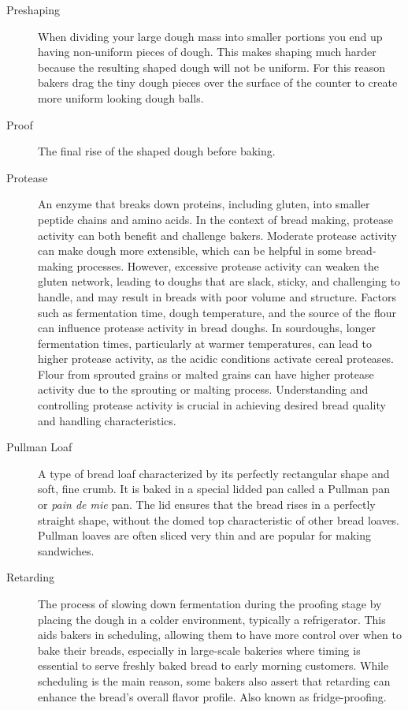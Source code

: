 \begin{description}
\item[Preshaping] When dividing your large dough mass into smaller portions you end
up having non-uniform pieces of dough. This makes shaping much harder because the
resulting shaped dough will not be uniform. For this reason bakers drag the tiny dough
pieces over the surface of the counter to create more uniform looking dough balls.

\item[Proof] The final rise of the shaped dough before baking.

\item[Protease] An enzyme that breaks down proteins, including gluten, into smaller
peptide chains and amino acids. In the context of bread making, protease activity can
both benefit and challenge bakers. Moderate protease activity can make dough more
extensible, which can be helpful in some bread-making processes. However, excessive
protease activity can weaken the gluten network, leading to doughs that are slack,
sticky, and challenging to handle, and may result in breads with poor volume and
structure. Factors such as fermentation time, dough temperature, and the source of the
flour can influence protease activity in bread doughs. In sourdoughs, longer
fermentation times, particularly at warmer temperatures, can lead to higher protease
activity, as the acidic conditions activate cereal proteases. Flour from sprouted
grains or malted grains can have higher protease activity due to the sprouting or
malting process. Understanding and controlling protease activity is crucial in
achieving desired bread quality and handling characteristics.

\item[Pullman Loaf] A type of bread loaf characterized by its perfectly
    rectangular shape and soft, fine crumb. It is baked in a special lidded
    pan called a Pullman pan or \emph{pain de mie} pan. The lid ensures that
    the bread rises in a perfectly straight shape, without the domed top
    characteristic of other bread loaves. Pullman loaves are often sliced very
    thin and are popular for making sandwiches.

\item[Retarding] The process of slowing down fermentation during the proofing
stage by placing the dough in a colder environment, typically a refrigerator. This aids
bakers in scheduling, allowing them to have more control over when to bake their breads,
especially in large-scale bakeries where timing is essential to serve freshly baked bread
to early morning customers. While scheduling is the main reason, some bakers also assert
that retarding can enhance the bread's overall flavor profile. Also known as
fridge-proofing.


\end{description}
